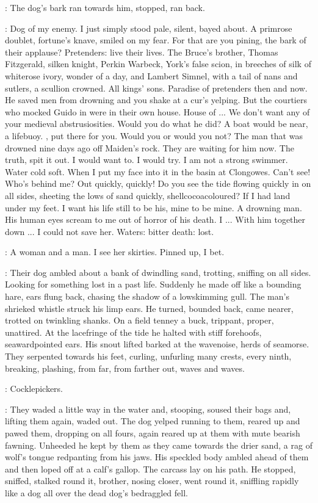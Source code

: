 :
The dog's bark ran towards him, stopped, ran back.

\StephenInt:
Dog of my enemy.
I just simply stood pale, silent, bayed about.
A primrose doublet, fortune's knave, smiled on my fear.
For that are you pining,
the bark of their applause?
Pretenders:
live their lives.
The Bruce's brother,
Thomas Fitzgerald, silken knight,
Perkin Warbeck, York's false scion,
in breeches of silk of whiterose ivory,
wonder of a day,
and Lambert Simnel, with a tail of nans and sutlers, a scullion crowned.
All kings' sons.
Paradise of pretenders then and now.
He saved men from drowning
and you shake at a cur's yelping.
But the courtiers who mocked Guido in 
were in their own house.
House of ...
We don't want any of your medieval abstrusiosities.
Would you do what he did?
A boat would be near, a lifebuoy.
, put there for you.
Would you or would you not?
The man that was drowned nine days ago off Maiden's rock.
They are waiting for him now.
The truth, spit it out.
I would want to.
I would try.
I am not a strong swimmer.
Water cold soft.
When I put my face into it in the basin at Clongowes.
Can't see!
Who's behind me?
Out quickly, quickly!
Do you see the tide flowing quickly in on all sides,
sheeting the lows of sand quickly, shellcocoacoloured?
If I had land under my feet.
I want his life still to be his, mine to be mine.
A drowning man.
His human eyes scream to me out of horror of his death.
I ...
With him together down ...
I could not save her.
Waters:
bitter death:
lost.

\StephenInt:
A woman and a man.
I see her skirties.
Pinned up, I bet.

:
Their dog ambled about a bank of dwindling sand,
trotting, sniffing on all sides.
Looking for something lost in a past life.
Suddenly he made off like a bounding hare,
ears flung back, chasing the shadow of a lowskimming gull.
The man's shrieked whistle struck his limp ears.
He turned, bounded back, came nearer, trotted on twinkling shanks.
On a field tenney
a buck, trippant, proper, unattired.
At the lacefringe of the tide
he halted with stiff forehoofs, seawardpointed ears.
His snout lifted
barked at the wavenoise, herds of seamorse.
They serpented towards his feet,
curling, unfurling many crests,
every ninth, breaking, plashing,
from far, from farther out,
waves and waves.

\StephenInt:
Cocklepickers.

:
They waded a little way in the water and, stooping,
soused their bags and, lifting them again, waded out.
The dog yelped
running to them,
reared up and pawed them,
dropping on all fours,
again reared up at them with mute bearish fawning.
Unheeded
he kept by them
as they came towards the drier sand,
a rag of wolf's tongue redpanting from his jaws.
His speckled body ambled ahead of them
and then loped off at a calf's gallop.
The carcass lay on his path.
He stopped, sniffed, stalked round it,
brother, nosing closer, went round it,
sniffling rapidly like a dog all over the dead dog's bedraggled fell.

